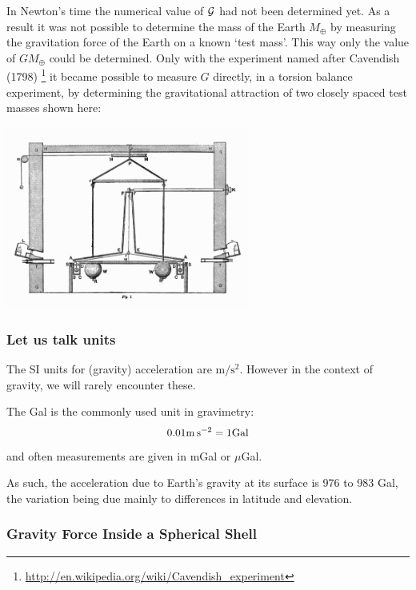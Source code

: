 In Newton's time the numerical value of ${\cal G}$ had not been
determined yet. 
As a result it was not possible to determine the mass of the 
Earth $M_{\oplus}$ by measuring the gravitation force of the Earth 
on a known `test mass'.
This way only the value of $G M_{\oplus}$ could be determined.
Only with the experiment named after Cavendish (1798)
\footnote{\url{http://en.wikipedia.org/wiki/Cavendish_experiment}}
it became possible
to measure $G$ directly, in a torsion balance experiment,
by determining the gravitational attraction of two closely spaced test 
masses shown here:  

\begin{center}
\includegraphics[width=8cm]{images/gravity/Cavendish_Experiment}
\end{center}


\subsubsection{Let us talk units}
 
The SI units for (gravity) acceleration are $\si{\metre\per\square\second}$.
However in the context of gravity, we will rarely encounter these.

The Gal is the commonly used unit in gravimetry:
\[
0.01 \si{\metre\per\square\second} = 1 {\rm Gal}
\]
and often measurements are given in mGal or $\mu$Gal.

As such, the acceleration due to Earth's gravity 
at its surface is 976 to 983 Gal, the variation being due 
mainly to differences in latitude and elevation. 


\subsubsection{Gravity Force Inside a Spherical Shell}


